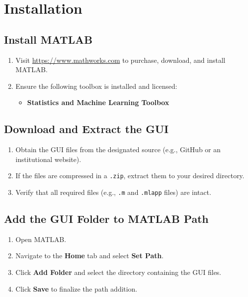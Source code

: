 \chapter{Installation}

\section{Install MATLAB}
\begin{enumerate}
    \item Visit \url{https://www.mathworks.com} to purchase, download, and install MATLAB.
    \item Ensure the following toolbox is installed and licensed:
    \begin{itemize}
        \item \textbf{Statistics and Machine Learning Toolbox}
    \end{itemize}
\end{enumerate}

\section{Download and Extract the GUI}
\begin{enumerate}
    \item Obtain the GUI files from the designated source (e.g., GitHub or an institutional website).
    \item If the files are compressed in a \texttt{.zip}, extract them to your desired directory.
    \item Verify that all required files (e.g., \texttt{.m} and \texttt{.mlapp} files) are intact.
\end{enumerate}

\section{Add the GUI Folder to MATLAB Path}
\begin{enumerate}
    \item Open MATLAB.
    \item Navigate to the \textbf{Home} tab and select \textbf{Set Path}.
    \item Click \textbf{Add Folder} and select the directory containing the GUI files.
    \item Click \textbf{Save} to finalize the path addition.
\end{enumerate}


